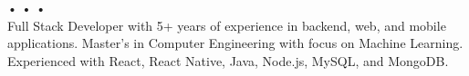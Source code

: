 \hspace*{1cm} \\ \vspace{5pt}
 \\ \vspace{5pt}
\href{tel:+1-872-258-5803}{\small{}}
\hspace{0.43em}•\hspace{0.43em}\href{mailto:ajoseph17@hawk.iit.edu}{\small{}}
\hspace{0.43em}•\hspace{0.43em}\href{https://www.linkedin.com/in/anselmj}{\small{}}
\hspace{0.43em}•\hspace{0.43em}\href{https://an23lm.github.io}{\small{}} \\ \vspace{10pt}
\small{Full Stack Developer with 5+ years of experience in backend, web, and mobile applications. Master's in Computer Engineering with focus on Machine Learning. Experienced with React, React Native, Java, Node.js, MySQL, and MongoDB.}
